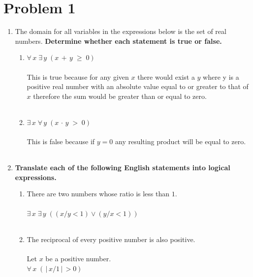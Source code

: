 \documentclass{amsart}
\theoremstyle{definition}
\theoremstyle{Exercise}
\theoremstyle{remark}
\theoremstyle{rule}
\numberwithin{equation}{section}
\begin{document}
\section*{Problem 1}
\begin{enumerate}[label=(\alph*)]
\item The domain for all variables in the expressions below is the set of real numbers. {\bf Determine whether each statement is true or false.}
\begin{enumerate}[label=(\roman*)]
  \item $\forall\, x\; \exists \,y\;(x\,+\,y\;\geq \;0)$
\\\\
This is true because for any given $x$ there would exist a $y$ where y is a positive real number with an absolute value equal to or greater to that of $x$ therefore the sum would be greater than or equal to zero.
\\\\
  \item $\exists \, x\; \forall \,y\;(x\,\cdot\,y\;>\; 0)$
   \\\\
This is false because if $y=0$ any resulting product will be equal to zero.
\\\\
\end{enumerate}

\item {\bf Translate each of the following English statements into logical expressions.}
\begin{enumerate}[label=(\roman*)]
  \item There are two numbers whose ratio is less than $1$.
   \\\\
$\exists \,x\; \exists \,y\; ((x/y < 1) \lor (y/x < 1))$
\\\\
  \item The reciprocal of every positive number is also positive.
   \\\\
Let $x$ be a positive number.\\
$\forall \,x\; (\,|\,x/1\,|\, > 0)$
\\\\
  \end{enumerate}
  \end{enumerate}
  \newpage
\end{document}
